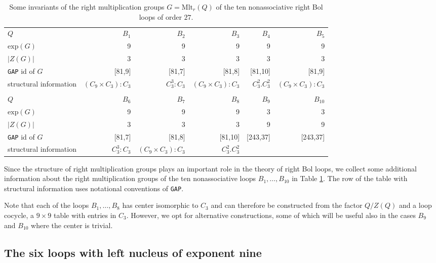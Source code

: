 \documentclass[12pt,reqno]{amsart}
\numberwithin{equation}{section}
\theoremstyle{plain}
\theoremstyle{definition}
\newcommand{\exponent}[1]{\mathrm{exp}(#1)}
\newcommand{\rmlt}[1]{\mathrm{Mlt}_r(#1)}
\newcommand{\Z}{C}
\begin{document}
\begin{table}
\begin{footnotesize}
\begin{tabular}{lrrrrr}
\toprule
$Q$                                 	&$B_1$ 					&$B_2$						&$B_3$ 						&$B_4$				&$B_5$\\
$\exponent{G}$				&9						&9							&9							&9					&9\\
$|Z(G)|$						&3						&3							&3							&3					&3\\
\texttt{GAP} id of $G$		&[81,9]					&[81,7]						&[81,8]						&[81,10]			&[81,9]\\	
structural information			&$(\Z_9\times\Z_3):\Z_3$&$\Z_3^3:\Z_3$				&$(\Z_9\times\Z_3):\Z_3$		&$\Z_3^2.\Z_3^2$	&$(\Z_9\times\Z_3):\Z_3$\\
\\
$Q$                                 	&$B_6$					&$B_7$						&$B_8$						&$B_9$				&$B_{10}$\\
$\exponent{G}$				&9						&9							&9							&3					&3\\
$|Z(G)|$						&3						&3							&3							&9					&9\\
\texttt{GAP} id of $G$		&[81,7]					&[81,8]						&[81,10]					&[243,37]			&[243,37]\\	
structural information			&$\Z_3^3:\Z_3$			&$(\Z_9\times\Z_3):\Z_3$		&$\Z_3^2.\Z_3^2$			&					&\\
\bottomrule
\end{tabular}
\end{footnotesize}
\medskip
\caption{Some invariants of the right multiplication groups $G=\rmlt{Q}$ of the ten nonassociative right Bol loops of order $27$.}\label{Tb:Mltrs}
\end{table}

Since the structure of right multiplication groups plays an important role in the theory of right Bol loops, we collect some additional information about the right multiplication groups of the ten nonassociative loops $B_1,\dots,B_{10}$ in Table \ref{Tb:Mltrs}. The row of the table with structural information uses notational conventions of \texttt{GAP}.

Note that each of the loops $B_1,\dots,B_8$ has center isomorphic to $\Z_3$ and can therefore be constructed from the factor $Q/Z(Q)$ and a loop cocycle, a $9\times 9$ table with entries in $\Z_3$. However, we opt for alternative constructions, some of which will be useful also in the cases $B_9$ and $B_{10}$ where the center is trivial.

\subsection{The six loops with left nucleus of exponent nine}
\end{document}
